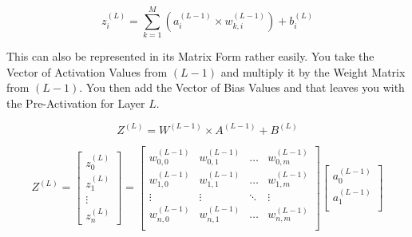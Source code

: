 \begin{flushleft}
                    \vspace{0.2cm}
                    \begin{center}
                        \[ z^{(L)}_{i} = \sum_{k=1}^{M}(a^{(L-1)}_{i} \times w^{(L-1)}_{k,i}) + b^{(L)}_{i} \]
                    \end{center}
                    \vspace{0.4cm}

                    This can also be represented in its Matrix Form rather easily. You take the Vector of Activation Values from $(L - 1)$ and multiply
                    it by the Weight Matrix from $(L - 1)$. You then add the Vector of Bias Values and that leaves you with the Pre-Activation for Layer
                    $L$.

                    \begin{center}
                        \[ Z^{(L)} = W^{(L-1)} \times A^{(L-1)} + B^{(L)}\]
                    \end{center}
                    \vspace{0.2cm}
                    \begin{center}
                        \[
                        Z^{(L)} = 
                        \begin{bmatrix}
                        z^{(L)}_{0} \\
                        z^{(L)}_{1} \\
                        \vdots      \\
                        z^{(L)}_{n} 
                        \end{bmatrix}
                        = 
                        \begin{bmatrix}
                        w^{(L-1)}_{0,0} & w^{(L-1)}_{0,1} & \hdots  & w^{(L-1)}_{0,m} \\
                        w^{(L-1)}_{1,0} & w^{(L-1)}_{1,1} & \hdots  & w^{(L-1)}_{1,m} \\
                        \vdots          & \vdots          & \ddots  & \vdots          \\
                        w^{(L-1)}_{n,0} & w^{(L-1)}_{n,1} & \hdots  & w^{(L-1)}_{n,m} \\
                        \end{bmatrix}
                        \begin{bmatrix}
                        a^{(L-1)}_{0} \\
                        a^{(L-1)}_{1} \\

\end{bmatrix}\]
\end{center}
\end{flushleft}
